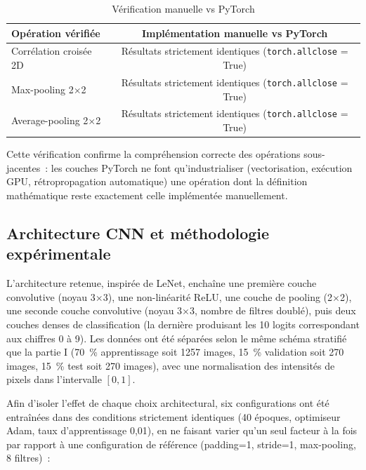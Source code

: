 \documentclass[11pt,a4paper]{article}
\begin{document}
\begin{table}[h]
\centering
\caption{Vérification manuelle vs PyTorch}
\begin{tabular}{lc}
\toprule
\textbf{Opération vérifiée} & \textbf{Implémentation manuelle vs PyTorch} \\
\midrule
Corrélation croisée 2D    & Résultats strictement identiques (\texttt{torch.allclose} = True) \\
Max-pooling 2$\times$2     & Résultats strictement identiques (\texttt{torch.allclose} = True) \\
Average-pooling 2$\times$2 & Résultats strictement identiques (\texttt{torch.allclose} = True) \\
\bottomrule
\end{tabular}
\end{table}

Cette vérification confirme la compréhension correcte des opérations sous-jacentes~: les couches PyTorch ne font qu'industrialiser (vectorisation, exécution GPU, rétropropagation automatique) une opération dont la définition mathématique reste exactement celle implémentée manuellement.

\subsection{Architecture CNN et méthodologie expérimentale}

L'architecture retenue, inspirée de LeNet, enchaîne une première couche convolutive (noyau 3$\times$3), une non-linéarité ReLU, une couche de pooling (2$\times$2), une seconde couche convolutive (noyau 3$\times$3, nombre de filtres doublé), puis deux couches denses de classification (la dernière produisant les 10 logits correspondant aux chiffres 0 à 9). Les données ont été séparées selon le même schéma stratifié que la partie I (70~\% apprentissage soit 1257 images, 15~\% validation soit 270 images, 15~\% test soit 270 images), avec une normalisation des intensités de pixels dans l'intervalle $[0, 1]$.

Afin d'isoler l'effet de chaque choix architectural, six configurations ont été entraînées dans des conditions strictement identiques (40 époques, optimiseur Adam, taux d'apprentissage 0,01), en ne faisant varier qu'un seul facteur à la fois par rapport à une configuration de référence (padding=1, stride=1, max-pooling, 8 filtres)~:
\end{document}
